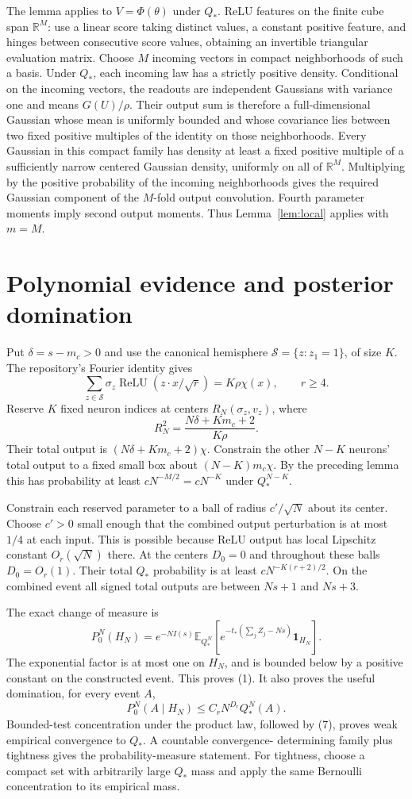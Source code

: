 \documentclass[11pt]{article}
\newcommand{\E}{\mathbb E}\newcommand{\Pp}{\mathbb P}
\newcommand{\R}{\mathbb R}\newcommand{\relu}{\operatorname{ReLU}}
\newcommand{\one}{\mathbf1}
\begin{document}
The lemma applies to $V=\Phi(\theta)$ under $Q_*$. ReLU features on
the finite cube span $\R^M$: use a linear score taking distinct values,
a constant positive feature, and hinges between consecutive score
values, obtaining an invertible triangular evaluation matrix.
Choose $M$ incoming vectors in compact neighborhoods of such a basis.
Under $Q_*$, each incoming law has a strictly positive density.
Conditional on the incoming vectors, the readouts are independent
Gaussians with variance one and means $G(U)/\rho$.
Their output sum is therefore a full-dimensional Gaussian whose mean
is uniformly bounded and whose covariance lies between two fixed
positive multiples of the identity on those neighborhoods.
Every Gaussian in this compact family has density at least a fixed
positive multiple of a sufficiently narrow centered Gaussian density,
uniformly on all of $\R^M$. Multiplying by the positive probability
of the incoming neighborhoods gives the required Gaussian component
of the $M$-fold output convolution. Fourth parameter moments imply
second output moments. Thus Lemma~\ref{lem:local} applies with $m=M$.

\section{Polynomial evidence and posterior domination}
Put $\delta=s-m_c>0$ and use the canonical hemisphere
$\mathcal S=\{z:z_1=1\}$, of size $K$. The repository's Fourier
identity gives
\[
 \sum_{z\in\mathcal S}\sigma_z\relu(z\cdot x/\sqrt r)
                         =K\rho\chi(x),\qquad r\ge4.       \tag{5}
\]
Reserve $K$ fixed neuron indices at centers
$R_N(\sigma_z,v_z)$, where
\[
 R_N^2=\frac{N\delta+Km_c+2}{K\rho}.
\]
Their total output is $(N\delta+Km_c+2)\chi$.
Constrain the other $N-K$ neurons' total output to a fixed small box
about $(N-K)m_c\chi$. By the preceding lemma this has probability
at least $cN^{-M/2}=cN^{-K}$ under $Q_*^{N-K}$.

Constrain each reserved parameter to a ball of radius $c'/\sqrt N$
about its center. Choose $c'>0$ small enough that the combined output
perturbation is at most $1/4$ at each input. This is possible because
ReLU output has local Lipschitz constant $O_r(\sqrt N)$ there.
At the centers $D_0=0$ and throughout these balls $D_0=O_r(1)$.
Their total $Q_*$ probability is at least
$cN^{-K(r+2)/2}$. On the combined event all signed total outputs
are between $Ns+1$ and $Ns+3$.

The exact change of measure is
\[
 P_0^N(H_N)=e^{-NI(s)}
 \E_{Q_*^N}\left[
 e^{-t_*(\sum_jZ_j-Ns)}\one_{H_N}\right].                  \tag{6}
\]
The exponential factor is at most one on $H_N$, and is bounded below
by a positive constant on the constructed event. This proves (1).
It also proves the useful domination, for every event $A$,
\[
 P_0^N(A\mid H_N)\le C_r N^{D_r}Q_*^N(A).                 \tag{7}
\]
Bounded-test concentration under the product law, followed by (7),
proves weak empirical convergence to $Q_*$. A countable convergence-
determining family plus tightness gives the probability-measure statement.
For tightness, choose a compact set with arbitrarily large $Q_*$ mass
and apply the same Bernoulli concentration to its empirical mass.
\end{document}
